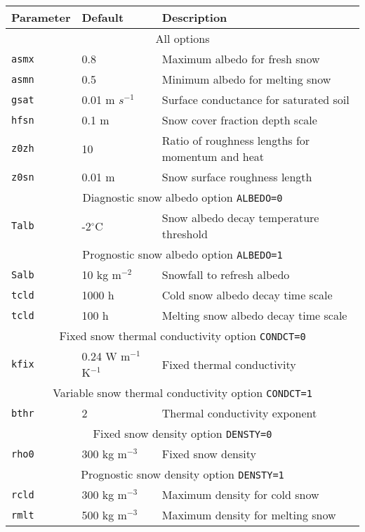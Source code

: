 \documentclass{article}
\begin{document}
\begin{tabular}{|l|l|l|}
\hline
Parameter & Default & Description \\
\hline
\hline 
\multicolumn{3}{|c|}{All options} \\
\hline 
{\tt asmx} & 0.8    & Maximum albedo for fresh snow   \\
{\tt asmn} & 0.5    & Minimum albedo for melting snow \\
{\tt gsat} & 0.01 m $s^{-1}$ & Surface conductance for saturated soil   \\
{\tt hfsn} & 0.1 m  & Snow cover fraction depth scale \\
{\tt z0zh} & 10     & Ratio of roughness lengths for momentum and heat  \\
{\tt z0sn} & 0.01 m & Snow surface roughness length   \\
\hline 
\hline 
\multicolumn{3}{|c|}{Diagnostic snow albedo option {\tt ALBEDO=0}} \\
\hline 
{\tt Talb} & -2$^\circ$C & Snow albedo decay temperature threshold  \\
\hline 
\hline 
\multicolumn{3}{|c|}{Prognostic snow albedo option {\tt ALBEDO=1}} \\
\hline 
{\tt Salb} & 10 kg m$^{-2}$ & Snowfall to refresh albedo           \\
{\tt tcld} & 1000 h         & Cold snow albedo decay time scale    \\
{\tt tcld} & 100 h          & Melting snow albedo decay time scale \\
\hline 
\hline 
\multicolumn{3}{|c|}{Fixed snow thermal conductivity option {\tt CONDCT=0}}    \\
\hline 
{\tt kfix} & 0.24 W m$^{-1}$ K$^{-1}$ & Fixed thermal conductivity               \\
\hline
\hline 
\multicolumn{3}{|c|}{Variable snow thermal conductivity option {\tt CONDCT=1}} \\
\hline 
{\tt bthr} & 2 & Thermal conductivity exponent                                   \\
\hline
\hline 
\multicolumn{3}{|c|}{Fixed snow density option {\tt DENSTY=0}} \\
\hline 
{\tt rho0} & 300 kg m$^{-3}$ & Fixed snow density \\
\hline
\hline 
\multicolumn{3}{|c|}{Prognostic snow density option {\tt DENSTY=1}} \\
\hline 
{\tt rcld} & 300 kg m$^{-3}$ & Maximum density for cold snow    \\
{\tt rmlt} & 500 kg m$^{-3}$ & Maximum density for melting snow \\

\end{tabular}
\end{document}
